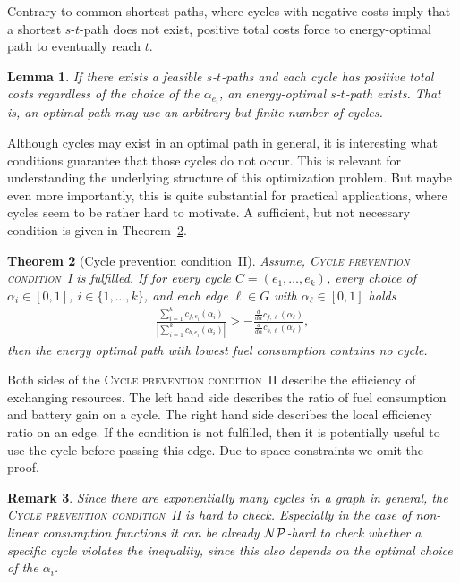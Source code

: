 \documentclass[a4paper]{scrartcl}
\newtheorem{theorem}{Theorem}
\newtheorem{lemma}[theorem]{Lemma}
\newtheorem{remark}[theorem]{Remark}
\begin{document}
Contrary to common shortest paths, where cycles with negative costs imply that a shortest $s$-$t$-path does not exist, positive total costs force to energy-optimal path to eventually reach $t$.

\begin{lemma}
If there exists a feasible $s$-$t$-paths and each cycle has positive total costs regardless of the choice of the $\alpha_{e_i}$, an energy-optimal $s$-$t$-path exists. That is, an optimal path may use an arbitrary but finite number of cycles.
\end{lemma}

Although cycles may exist in an optimal path in general, it is interesting what conditions guarantee that those cycles do not occur. This is relevant for understanding the underlying structure of this optimization problem. But maybe even more importantly, this is quite substantial for practical applications, where cycles seem to be rather hard to motivate. A sufficient, but not necessary condition is given in Theorem~\ref{theo:nocycles}.

\begin{theorem}[Cycle prevention condition~II]\label{theo:nocycles} Assume, \textsc{Cycle prevention condition~I} is fulfilled. If for every cycle $C=(e_1,\dots,e_k)$, every choice of $\alpha_{i}\in [0,1]$, $i\in\{1,\dots,k\}$, and each edge $\ell\in G$ with $\alpha_\ell\in [0,1]$ holds
\begin{align}
\frac{\sum_{i=1}^k c_{f,e_i} (\alpha_{i})}{\left\lvert \sum_{i=1}^k c_{b,e_i} (\alpha_{i}) \right\rvert} > -\frac{\frac{d}{d\alpha}c_{f,\ell}(\alpha_\ell)}{\frac{d}{d\alpha}c_{b,\ell}(\alpha_\ell)}\label{eq:cycleprevention2}, 
\end{align}
then the energy optimal path with lowest fuel consumption contains no cycle.
\end{theorem}

Both sides of the \textsc{Cycle prevention condition~II} describe the efficiency of exchanging resources. The left hand side describes the ratio of fuel consumption and battery gain on a cycle. The right hand side describes the local efficiency ratio on an edge. If the condition is not fulfilled, then it is potentially useful to use the cycle before passing this edge. Due to space constraints we omit the proof.

\begin{remark}
 Since there are exponentially many cycles in a graph in general, the \textsc{Cycle prevention condition~II} is hard to check. Especially in the case of non-linear consumption functions it can be already $\cal NP$-hard to check whether a specific cycle violates the inequality, since this also depends on the optimal choice of the $\alpha_{i}$.
\end{remark}
\end{document}
